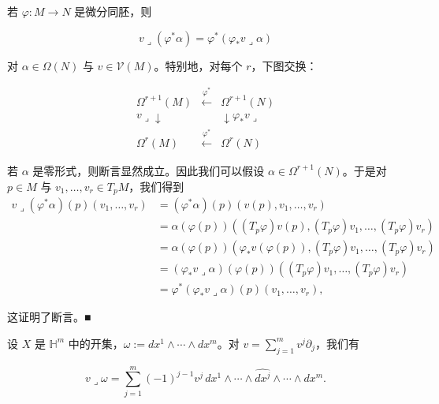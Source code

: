 \begin{examplenote}

\begin{items}
\item

若 $ \varphi: M\to N $ 是微分同胚，则

\[
v\lrcorner(\varphi^{\ast}\alpha) = \varphi^{\ast}(\varphi_{\ast}v\lrcorner\alpha)
\]

对 $ \alpha\in\Omega(N) $ 与 $ v\in\mathcal{V}(M) $。特别地，对每个 $ r $，下图交换：

\begin{equation*}
\begin{array}{ccc} \Omega^{r+1}(M) & \xleftarrow{\varphi^{\ast}} & \Omega^{r+1}(N) \\ v\lrcorner\downarrow & & \downarrow\varphi_{\ast}v\lrcorner \\ \Omega^{r}(M) & \xleftarrow{\varphi^{\ast}} & \Omega^{r}(N) \end{array}
\end{equation*}

\proofhead
若 $ \alpha $ 是零形式，则断言显然成立。因此我们可以假设 $ \alpha\in\Omega^{r+1}(N) $。于是对 $ p\in M $ 与 $ v_{1}, \ldots, v_{r}\in T_{p}M $，我们得到
\begin{equation*}
\begin{aligned}
v\lrcorner(\varphi^{\ast}\alpha)(p)(v_{1}, \ldots, v_{r}) &= (\varphi^{\ast}\alpha)(p)(v(p), v_{1}, \ldots, v_{r}) \\ &= \alpha(\varphi(p))((T_{p}\varphi)v(p), (T_{p}\varphi)v_{1}, \ldots, (T_{p}\varphi)v_{r}) \\ &= \alpha(\varphi(p))(\varphi_{\ast}v(\varphi(p)), (T_{p}\varphi)v_{1}, \ldots, (T_{p}\varphi)v_{r}) \\ &= (\varphi_{\ast}v\lrcorner\alpha)(\varphi(p))((T_{p}\varphi)v_{1}, \ldots, (T_{p}\varphi)v_{r}) \\ &= \varphi^{\ast}(\varphi_{\ast}v\lrcorner\alpha)(p)(v_{1}, \ldots, v_{r}) ,
\end{aligned}
\end{equation*}

这证明了断言。\nobreak\hspace{0.35em}■

\item

设 $ X $ 是 $ \mathbb{H}^{m} $ 中的开集，$ \omega := dx^{1}\wedge\cdots\wedge dx^{m} $。对 $ v = \sum_{j=1}^{m} v^{j}\partial_{j} $，我们有

\[
v\lrcorner\omega = \sum_{j=1}^{m}(-1)^{j-1}v^{j}\,dx^{1}\wedge\cdots\wedge\widehat{dx^{j}}\wedge\cdots\wedge dx^{m} .
\]


\end{items}
\end{examplenote}
